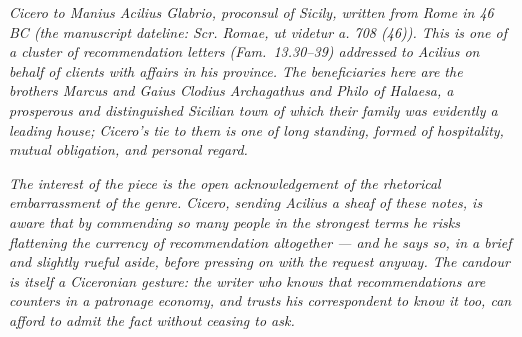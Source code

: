 
\textit{Cicero to Manius Acilius Glabrio, proconsul of
Sicily, written from Rome in 46 BC (the manuscript
dateline: \textit{Scr. Romae, ut videtur a. 708 (46)}).
This is one of a cluster of recommendation letters
(Fam.\ 13.30--39) addressed to Acilius on behalf of
clients with affairs in his province. The beneficiaries
here are the brothers Marcus and Gaius Clodius
Archagathus and Philo of Halaesa, a prosperous and
distinguished Sicilian town of which their family was
evidently a leading house; Cicero's tie to them is one
of long standing, formed of hospitality, mutual
obligation, and personal regard.}

\textit{The interest of the piece is the open
acknowledgement of the rhetorical embarrassment of the
genre. Cicero, sending Acilius a sheaf of these notes,
is aware that by commending so many people in the
strongest terms he risks flattening the currency of
recommendation altogether --- and he says so, in a brief
and slightly rueful aside, before pressing on with the
request anyway. The candour is itself a Ciceronian
gesture: the writer who knows that recommendations are
counters in a patronage economy, and trusts his
correspondent to know it too, can afford to admit the
fact without ceasing to ask.}
